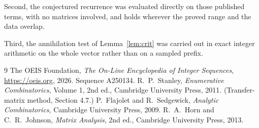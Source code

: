 \documentclass[11pt,a4paper]{article}
\theoremstyle{plain}
\theoremstyle{definition}
\begin{document}
Second, the conjectured recurrence was evaluated directly on those published terms, with no
matrices involved, and holds wherever the proved range and the data overlap.

Third, the annihilation test of Lemma~\ref{lem:crit} was carried out in exact integer
arithmetic on the whole vector rather than on a sampled prefix.

\begin{thebibliography}{9}
 The OEIS Foundation, \emph{The On-Line Encyclopedia of Integer
Sequences}, \url{https://oeis.org}, 2026. Sequence A250134.
 R.~P.~Stanley, \emph{Enumerative Combinatorics}, Volume 1, 2nd ed.,
Cambridge University Press, 2011. (Transfer-matrix method, Section 4.7.)
 P.~Flajolet and R.~Sedgewick, \emph{Analytic Combinatorics}, Cambridge
University Press, 2009.
 R.~A.~Horn and C.~R.~Johnson, \emph{Matrix Analysis}, 2nd ed., Cambridge
University Press, 2013.
\end{thebibliography}
\end{document}
